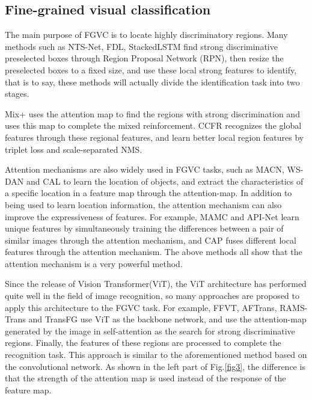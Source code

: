\documentclass[conference]{IEEEtran}
\begin{document}
\subsection{Fine-grained visual classification}
The main purpose of FGVC is to locate highly discriminatory regions. Many methods such as NTS-Net\cite{NTS_Net}, FDL\cite{FDL}, StackedLSTM\cite{Stacked_LSTM} find strong discriminative preselected boxes through Region Proposal Network (RPN), then resize the preselected boxes to a fixed size, and use these local strong features to identify, that is to say, these methods will actually divide the identification task into two stages.

Mix+\cite{Mix_plus} uses the attention map to find the regions with strong discrimination and uses this map to complete the mixed reinforcement. CCFR\cite{CCFR} recognizes the global features through these regional features, and learn better local region features by triplet loss and scale-separated NMS. 

Attention mechanisms are also widely used in FGVC tasks, such as MACN\cite{MA_CNN}, WS-DAN\cite{WS_DAN} and CAL\cite{CAL} to learn the location of objects, and extract the characteristics of a specific location in a feature map through the attention-map. In addition to being used to learn location information, the attention mechanism can also improve the expressiveness of features. For example, MAMC\cite{MAMC} and API-Net\cite{API_Net} learn unique features by simultaneously training the differences between a pair of similar images through the attention mechanism, and CAP\cite{CAP} fuses different local features through the attention mechanism. The above methods all show that the attention mechanism is a very powerful method.

Since the release of Vision Transformer(ViT)\cite{ViT}, the ViT architecture has performed quite well in the field of image recognition, so many approaches are proposed to apply this architecture to the FGVC task. For example, FFVT\cite{FFVT}, AFTrans\cite{AFTrans}, RAMS-Trans\cite{RAMS_Trans} and TransFG\cite{TransFG} use ViT as the backbone network, and use the attention-map generated by the image in self-attention as the search for strong discriminative regions. Finally, the features of these regions are processed to complete the recognition task. This approach is similar to the aforementioned method based on the convolutional network. As shown in the left part of Fig.\ref{fig3}, the difference is that the strength of the attention map is used instead of the response of the feature map.
\end{document}
